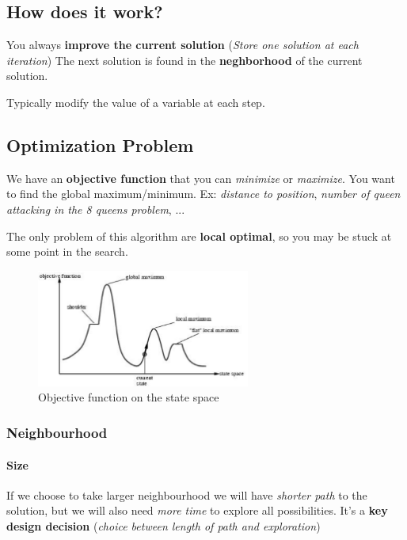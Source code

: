 \subsection{How does it work?}

You always \textbf{improve the current solution} (\textit{Store one solution at each iteration})
The next solution is found in the \textbf{neghborhood} of the current solution.

Typically modify the value of a variable at each step.

\subsection{Optimization Problem}

We have an \textbf{objective function} that you can \textit{minimize} or
\textit{maximize}.  You want  to  find the  global maximum/minimum.  Ex:
\textit{distance to position}, \textit{number  of queen attacking in the
8 queens problem}, ...

The only  problem of this  algorithm are \textbf{local optimal},  so you
may be stuck at some point in the search.

\begin{figure}[h]
    \centering
    \includegraphics[width=7cm]{local.png}
    \caption{Objective function on the state space}
\end{figure}

\subsubsection{Neighbourhood}

\paragraph{Size} 
If we choose  to take larger neighbourhood we  will have \textit{shorter
path}  to the  solution, but  we will  also need  \textit{more time}  to
explore all possibilities. It's a \textbf{key design decision} (\textit{choice
between length of path and exploration})

